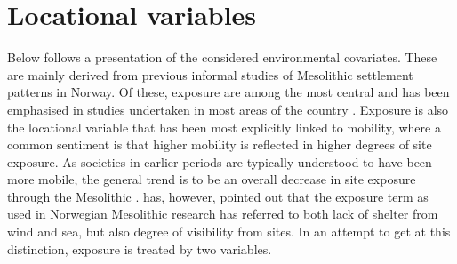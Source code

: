 \documentclass[12pt, a4paper]{article}
\begin{document}
\section{Locational variables}
Below follows a presentation of the considered environmental covariates. These are mainly derived from previous informal studies of Mesolithic settlement patterns in Norway. Of these, exposure are among the most central and has been emphasised in studies undertaken in most areas of the country \citep[][]{bjerck2008, berghansen2009, aastveit2014}. Exposure is also the locational variable that has been most explicitly linked to mobility, where a common sentiment is that higher mobility is reflected in higher degrees of site exposure. As societies in earlier periods are typically understood to have been more mobile, the general trend is to be an overall decrease in site exposure through the Mesolithic \citep[e.g.][]{lindblom1984, jaksland2001, bjerck2008, breivik2018}. \cite{svendsen2014} has, however, pointed out that the exposure term as used in Norwegian Mesolithic research has referred to both lack of shelter from wind and sea, but also degree of visibility from sites. In an attempt to get at this distinction, exposure is treated by two variables. \par
\end{document}
